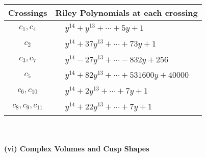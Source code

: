 \documentclass[1p]{elsarticle_modified}
\theoremstyle{definition}
\begin{document}
\begin{tabular}{m{50pt}|m{274pt}}
Crossings & \hspace{64pt}Riley Polynomials at each crossing \\
\hline $$\begin{aligned}c_{1},c_{4}\end{aligned}$$&$\begin{aligned}
&y^{14}+y^{13}+\cdots+5 y+1
\end{aligned}$\\
\hline $$\begin{aligned}c_{2}\end{aligned}$$&$\begin{aligned}
&y^{14}+37 y^{13}+\cdots+73 y+1
\end{aligned}$\\
\hline $$\begin{aligned}c_{3},c_{7}\end{aligned}$$&$\begin{aligned}
&y^{14}-27 y^{13}+\cdots-832 y+256
\end{aligned}$\\
\hline $$\begin{aligned}c_{5}\end{aligned}$$&$\begin{aligned}
&y^{14}+82 y^{13}+\cdots+531600 y+40000
\end{aligned}$\\
\hline $$\begin{aligned}c_{6},c_{10}\end{aligned}$$&$\begin{aligned}
&y^{14}+2 y^{13}+\cdots+7 y+1
\end{aligned}$\\
\hline $$\begin{aligned}c_{8},c_{9},c_{11}\end{aligned}$$&$\begin{aligned}
&y^{14}+22 y^{13}+\cdots+7 y+1
\end{aligned}$\\
\hline
\end{tabular}\\~\\
\newpage\flushleft \textbf{(vi) Complex Volumes and Cusp Shapes}
\end{document}
